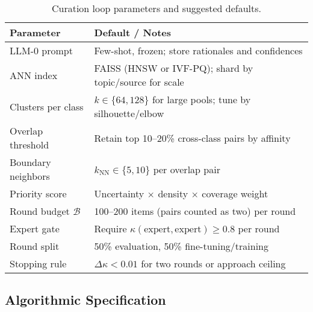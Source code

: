 \documentclass[ai,article,submit,pdftex,moreauthors]{Definitions/mdpi}
\begin{document}
\begin{table}[H]
\caption{Curation loop parameters and suggested defaults.}\label{tab:curation_params}
\centering
\begin{tabular}{ll}
\toprule
\textbf{Parameter} & \textbf{Default / Notes}\\
\midrule
LLM-0 prompt & Few-shot, frozen; store rationales and confidences\\
ANN index & FAISS (HNSW or IVF-PQ); shard by topic/source for scale\\
Clusters per class & $k\in\{64,128\}$ for large pools; tune by silhouette/elbow\\
Overlap threshold & Retain top 10--20\% cross-class pairs by affinity\\
Boundary neighbors & $k_{\mathrm{NN}}\in\{5,10\}$ per overlap pair\\
Priority score & Uncertainty $\times$ density $\times$ coverage weight\\
Round budget $\mathcal{B}$ & 100--200 items (pairs counted as two) per round\\
Expert gate & Require $\kappa(\text{expert},\text{expert})\ge 0.8$ per round\\
Round split & 50\% evaluation, 50\% fine-tuning/training\\
Stopping rule & $\Delta\kappa < 0.01$ for two rounds or approach ceiling\\
\bottomrule
\end{tabular}
\end{table}
%
%  
\subsection{Algorithmic Specification}\label{subsec:algorithm}
\end{document}
